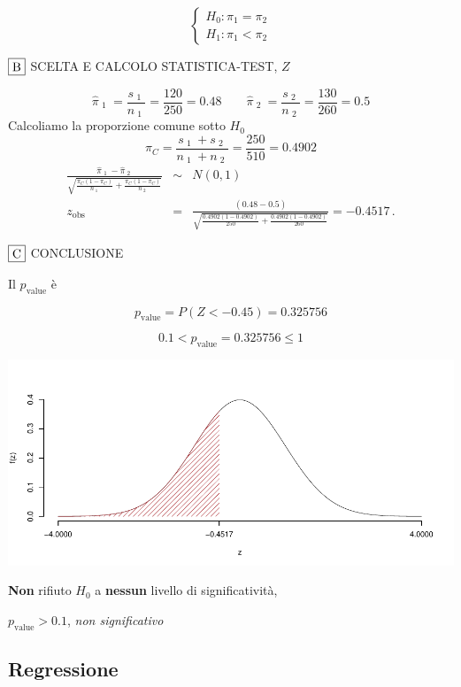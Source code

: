 \documentclass[
  11pt,
]{book}
\theoremstyle{mytheoremstyle}
\theoremstyle{mydefstyle}
\begin{document}
\[\begin{cases}
   H_0: \pi_\text{1} = \pi_\text{2} \\
   H_1: \pi_\text{1} < \pi_\text{2} 
   \end{cases}\]

\(\fbox{B}\) SCELTA E CALCOLO STATISTICA-TEST, \(Z\)

\[\hat\pi_\text{ 1 }=\frac{s_\text{ 1 }}{n_\text{ 1 }}=\frac{ 120 }{ 250 }= 0.48 \qquad
   \hat\pi_\text{ 2 }=\frac{s_\text{ 2 }}{n_\text{ 2 }}=\frac{ 130 }{ 260 }= 0.5 \]Calcoliamo la proporzione comune sotto \(H_0\)
\[
     \pi_C=\frac{s_\text{ 1 }+s_\text{ 2 }}{n_\text{ 1 }+n_\text{ 2 }}=
     \frac{ 250 }{ 510 }= 0.4902 
   \]\begin{eqnarray*}
   \frac{\hat\pi_\text{ 1 } - \hat\pi_\text{ 2 }}
   {\sqrt{\frac {\pi_C(1-\pi_C)}{n_\text{ 1 }}+\frac {\pi_C(1-\pi_C)}{n_\text{ 2 }}}}&\sim&N(0,1)\\
   z_{\text{obs}}
   &=& \frac{ ( 0.48 -  0.5 )} {\sqrt{\frac{ 0.4902 (1- 0.4902 )}{ 250 }+\frac{ 0.4902 (1- 0.4902 )}{ 260 }}}
   =   -0.4517 \, .
   \end{eqnarray*}

\(\fbox{C}\) CONCLUSIONE

Il \(p_{\text{value}}\) è

\[ p_{\text{value}} = P(Z<-0.45)=0.325756 \]

\[
 0.1 < p_\text{value}= 0.325756 \leq 1 
\]

\begin{center}\includegraphics{Appunti_di_Statistica_2025_files/figure-latex/25-test-functions-10-13} \end{center}

\textbf{Non} rifiuto \(H_0\) a \textbf{nessun}
livello di significatività,

\(p_\text{value}>0.1\),
\emph{non significativo}

\subsection{Regressione}\label{regressione-1}
\end{document}
